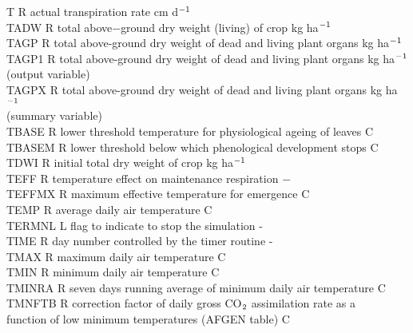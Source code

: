 \documentclass[11pt]{article}
\begin{document}
\begin{tabbing}
T       \> \> R   \> actual transpiration rate                          \> \> \> \> \> \> \> cm d$^{{\rm -1}}$\\
TADW    \> \> R   \> total above$-$ground dry weight (living) of crop     \> \> \> \> \> \> \> kg ha$^{{\rm -1}}$\\
TAGP\> \> R\> total above-ground dry weight of dead and living plant organs\> \> \> \> \> \> \> kg ha$^{{\rm -1}}$\\
TAGP1\> \> R\> total above-ground dry weight of dead and living plant organs \> \> \> \> \> \> \> kg ha$^{{\rm -1}}$\\
\>\> \> (output variable)\\
TAGPX\> \> R\> total above-ground dry weight of dead and living plant organs \> \> \> \> \> \> \> kg ha$^{{\rm -1}}$\\
\>\> \> (summary variable)\\
TBASE\> \> R\> lower threshold temperature for physiological ageing of leaves\> \> \> \> \> \> \> \degrees C \\
TBASEM\> \> R\> lower threshold below which phenological development stops \> \> \> \> \> \> \> \degrees C\\
TDWI\> \> R\> initial total dry weight of crop\> \> \> \> \> \> \> kg ha$^{{\rm -1}}$ \\
TEFF    \> \> R   \> temperature effect on maintenance respiration      \> \> \> \> \> \> \> $-$\\
TEFFMX\> \> R\> maximum effective temperature for emergence\> \> \> \> \> \> \> \degrees C\\
TEMP    \> \> R   \> average daily air temperature                      \> \> \> \> \> \> \> \degrees C\\
TERMNL\> \> L\> flag to indicate to stop the simulation\> \> \> \> \> \> \> -\\
TIME\> \> R\> day number controlled by the timer routine\> \> \> \> \> \> \> -\\
TMAX    \> \> R   \> maximum daily air temperature                      \> \> \> \> \> \> \> \degrees C\\
TMIN    \> \> R   \> minimum daily air temperature                      \> \> \> \> \> \> \> \degrees C\\
TMINRA  \> \> R   \> seven days running average of minimum daily air temperature   \> \> \> \> \> \> \> \degrees C\\
TMNFTB\> \> R\> correction factor of daily gross CO$_{{\rm 2}}$ assimilation rate as a\\
\>\> \> function of low minimum temperatures (AFGEN table)\> \> \> \> \> \> \> \degrees C\\

\end{tabbing}
\end{document}
